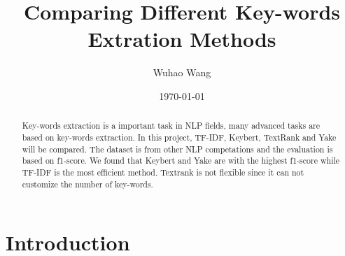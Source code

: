 \documentclass[11pt,a4paper]{article}
\title{Comparing Different Key-words Extration Methods}
\author{Wuhao Wang}
\date{\today}
\begin{document}
\maketitle


\begin{abstract}
Key-words extraction is a important task in NLP fields, many advanced tasks are based on key-words extraction.
In this project, TF-IDF, Keybert, TextRank and Yake will be compared. The dataset is from other NLP competations
and the evaluation is based on f1-score. We found that Keybert and Yake are with the highest f1-score while
TF-IDF is the most efficient method. Textrank is not flexible since it can not customize the number of key-words.  
\end{abstract}
\section{Introduction}
\end{document}
